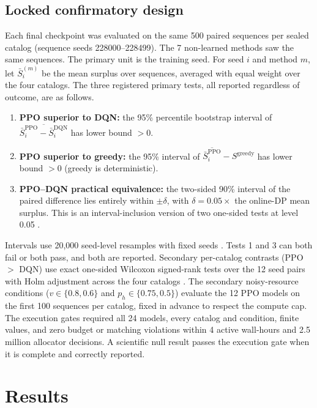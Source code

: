 \documentclass[11pt,a4paper]{article}
\begin{document}
\subsection{Locked confirmatory design}\label{sec:design}

Each final checkpoint was evaluated on the same 500 paired sequences per sealed catalog (sequence seeds 228000--228499). The 7 non-learned methods saw the same sequences. The primary unit is the training seed. For seed $i$ and method $m$, let $\bar S^{(m)}_i$ be the mean surplus over sequences, averaged with equal weight over the four catalogs. The three registered primary tests, all reported regardless of outcome, are as follows.
\begin{enumerate}[leftmargin=*]
  \item \textbf{PPO superior to DQN:} the 95\% percentile bootstrap interval of $\overline{\bar S^{\mathrm{PPO}}_i-\bar S^{\mathrm{DQN}}_i}$ has lower bound $>0$.
  \item \textbf{PPO superior to greedy:} the 95\% interval of $\overline{\bar S^{\mathrm{PPO}}_i}-S^{\mathrm{greedy}}$ has lower bound $>0$ (greedy is deterministic).
  \item \textbf{PPO--DQN practical equivalence:} the two-sided 90\% interval of the paired difference lies entirely within $\pm\delta$, with $\delta=0.05\times$ the online-DP mean surplus. This is an interval-inclusion version of two one-sided tests at level 0.05 \cite{schuirmann1987comparison}.
\end{enumerate}
Intervals use 20{,}000 seed-level resamples with fixed seeds \cite{efron1993introduction}. Tests 1 and 3 can both fail or both pass, and both are reported. Secondary per-catalog contrasts (PPO $>$ DQN) use exact one-sided Wilcoxon signed-rank tests over the 12 seed pairs \cite{wilcoxon1945individual} with Holm adjustment across the four catalogs \cite{holm1979simple}. The secondary noisy-resource conditions ($v\in\{0.8,0.6\}$ and $p_h\in\{0.75,0.5\}$) evaluate the 12 PPO models on the first 100 sequences per catalog, fixed in advance to respect the compute cap. The execution gates required all 24 models, every catalog and condition, finite values, and zero budget or matching violations within 4 active wall-hours and 2.5 million allocator decisions. A scientific null result passes the execution gate when it is complete and correctly reported.

\section{Results}\label{sec:results}
\end{document}
